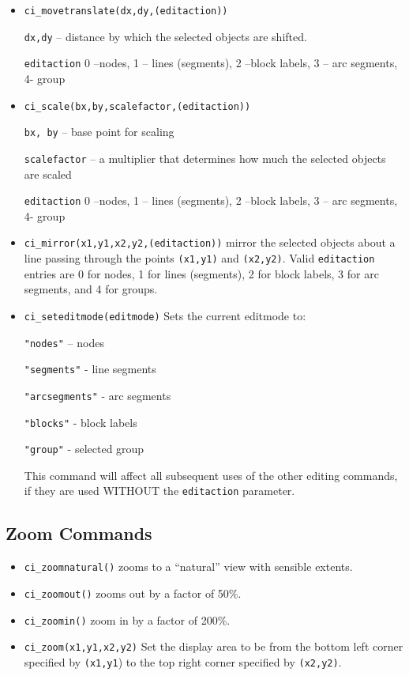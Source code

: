\begin{itemize}
\item \texttt{ci\_movetranslate(dx,dy,(editaction))}

\texttt{dx,dy} -- distance by which the selected objects are shifted.

\texttt{editaction} 0 --nodes, 1 -- lines (segments), 2 --block labels, 3 --
arc segments, 4- group

\item \texttt{ci\_scale(bx,by,scalefactor,(editaction))}

\texttt{bx, by} -- base point for scaling

\texttt{scalefactor} -- a multiplier that determines how much the selected
objects are scaled

\texttt{editaction} 0 --nodes, 1 -- lines (segments), 2 --block labels, 3 --
arc segments, 4- group

\item \texttt{ci\_mirror(x1,y1,x2,y2,(editaction))} mirror the selected objects about
a line passing through the points \texttt{(x1,y1)} and
\texttt{(x2,y2)}. Valid \texttt{editaction} entries are 0 for
nodes, 1 for lines (segments), 2 for block labels, 3 for arc
segments, and 4 for groups.

\item \texttt{ci\_seteditmode(editmode)} Sets the current editmode to:

\texttt{"nodes"} -- nodes

\texttt{"segments"} - line segments

\texttt{"arcsegments"} - arc segments

\texttt{"blocks"} - block labels

\texttt{"group"} - selected group

This command will affect all subsequent uses of the other editing
commands, if they are used WITHOUT the \texttt{editaction}
parameter.
\end{itemize}

\subsection{Zoom Commands}

\begin{itemize}
\item \texttt{ci\_zoomnatural()} zooms to a ``natural'' view with sensible extents.

\item \texttt{ci\_zoomout()} zooms out by a factor of 50{\%}.

\item \texttt{ci\_zoomin()} zoom in by a factor of 200{\%}.

\item \texttt{ci\_zoom(x1,y1,x2,y2)} Set the display area to be from the bottom left
corner specified by \texttt{(x1,y1}) to the top right corner
specified by \texttt{(x2,y2)}.
\end{itemize}

